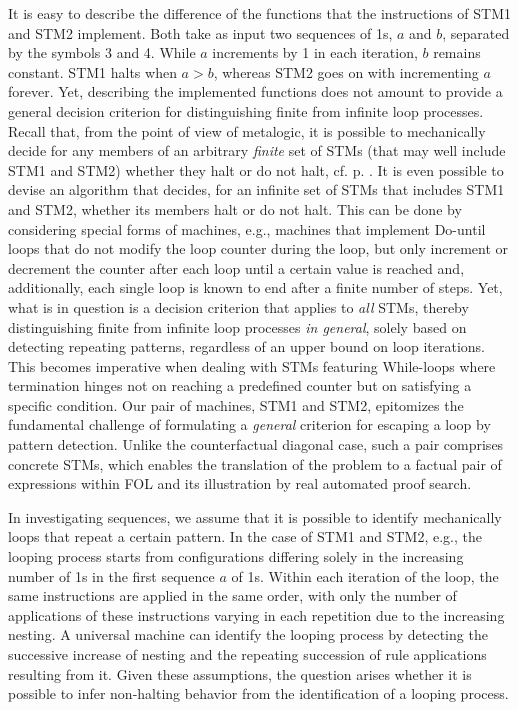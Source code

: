 \documentclass[%
  manuscript=article,   %
  year=2024,
  volume=77,
  doi=00000.000,
]{zfn}
\begin{document}
It is easy to describe the difference of the functions that the instructions of STM1 and STM2 implement. Both take as input two sequences of 1s, $a$ and $b$, separated by the symbols 3 and 4. While $a$ increments by 1 in each iteration, $b$ remains constant. STM1 halts when $a > b$, whereas STM2 goes on with incrementing $a$ forever. Yet, describing the implemented functions does not amount to provide a general decision criterion for distinguishing finite from infinite loop processes. Recall that, from the point of view of metalogic, it is possible to mechanically decide for any members of an arbitrary \emph{finite} set of STMs (that may well include STM1 and STM2) whether they halt or do not halt, cf. p. \pageref{metafinite}. It is even possible to devise an algorithm that decides, for an infinite set of STMs that includes STM1 and STM2, whether its members halt or do not halt. This can be done by considering special forms of machines, e.g., machines that implement Do-until loops that do not modify the loop counter during the loop, but only increment or decrement the counter after each loop until a certain value is reached and, additionally, each single loop is known to end after a finite number of steps. Yet, what is in question is a decision criterion that applies to \emph{all} STMs, thereby distinguishing finite from infinite loop processes \emph{in general}, solely based on detecting repeating patterns, regardless of an upper bound on loop iterations. This becomes imperative when dealing with STMs featuring While-loops where termination hinges not on reaching a predefined counter but on satisfying a specific condition. Our pair of machines, STM1 and STM2, epitomizes the fundamental challenge of formulating a \emph{general} criterion for escaping a loop by pattern detection. Unlike the counterfactual diagonal case, such a pair comprises concrete STMs, which enables the translation of the problem to a factual pair of expressions within FOL and its illustration by real automated proof search.

In investigating sequences, we assume that it is possible to identify mechanically loops that repeat a certain pattern. In the case of STM1 and STM2, e.g., the looping process starts from configurations differing solely in the increasing number of 1s in the first sequence $a$ of 1s. Within each iteration of the loop, the same instructions are applied in the same order, with only the number of applications of these instructions varying in each repetition due to the increasing nesting. A universal machine can identify the looping process by detecting the successive increase of nesting and the repeating succession of rule applications resulting from it. Given these assumptions, the question arises whether it is possible to infer non-halting behavior from the identification of a looping process. 
\end{document}
